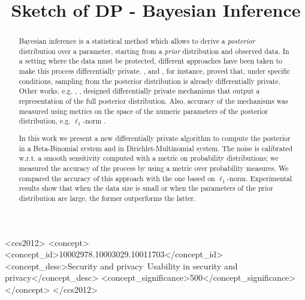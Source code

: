 \documentclass[sigconf, anonymous]{acmart}
\begin{document}
\title{Sketch of DP - Bayesian Inference} %

\begin{abstract}
Bayesian inference is a statistical method which allows to derive a
\emph{posterior} distribution over a parameter, starting from a
\emph{prior} distribution and observed data.  In a setting where the
data must be protected, different approaches have been taken to make
this process differentially private. \citet{dimitrakakis2014robust},
and \citet{wang2015privacy}, for instance, proved that, under specific
conditions, sampling from the posterior distribution is already
differentially private. Other works,
e.g. \cite{zhang2016differential}, \cite{foulds2016theory}, designed
differentially private mechanisms that output a representation of the
full posterior distribution. Also, accuracy of the mechanisms was
measured using metrics on the space of the numeric parameters of the
posterior distribution, e.g. $\ell_1$-norm .

In this work we present a new differentially private algorithm to
compute the posterior in a Beta-Binomial system and in Dirichlet-Multinomial system.
The noise is calibrated w.r.t. a smooth
sensitivity computed with a metric on probability distributions; we
measured the accuracy of the process by using a metric over
probability measures. We compared the accuracy of this approach with
the one based on $\ell_1$-norm. Experimental results show that when
the data size is small or when the parameters of the prior
distribution are large, the former outperforms the latter.

\end{abstract}


\begin{CCSXML}
<ccs2012>
<concept>
<concept_id>10002978.10003029.10011703</concept_id>
<concept_desc>Security and privacy~Usability in security and privacy</concept_desc>
<concept_significance>500</concept_significance>
</concept>
</ccs2012>
\end{CCSXML}



\maketitle
\end{document}
